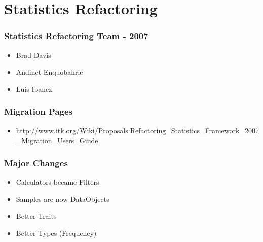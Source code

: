 \section{Statistics Refactoring}



{
\begin{frame}
\frametitle{Statistics Refactoring Team - 2007}
\large
\begin{itemize}
\item Brad Davis
\item Andinet Enquobahrie
\item Luis Ibanez
\end{itemize}
\end{frame}
}


{
\begin{frame}
\small
\frametitle{Migration Pages}
\begin{itemize}
\item \url{http://www.itk.org/Wiki/Proposals:Refactoring_Statistics_Framework_2007_Migration_Users_Guide}
\end{itemize}
\end{frame}
}


{
\begin{frame}
\small
\frametitle{Major Changes}
\begin{itemize}
\item Calculators became Filters
\item Samples are now DataObjects
\item Better Traits
\item Better Types (Frequency)
\end{itemize}
\end{frame}
}

